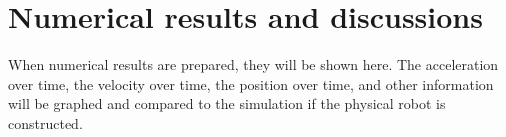 \section{Numerical results and discussions}
\label{results}
\indent When numerical results are prepared, they will be shown here. The acceleration over time, the velocity over time, the position over time, and other information will be graphed and compared to the simulation if the physical robot is constructed.\\
